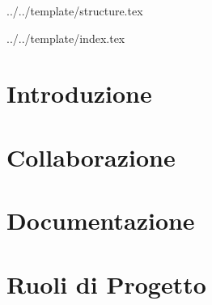 


\def\DOCUMENTO{Norme di Progetto}
\def\VERSIONE{1.0.0}

\def\DESCRIZIONE{Documento contenente l'insieme di norme stabilite dal gruppo \GRUPPO per la realizzazione del progetto didattico \PROGETTO.}

\def\REDATTORE {Suierica Bogdan \\ & Crespan Emanuele}
\def\VERIFICATORE {Agostinetto Matteo}
\def\RESPONSABILE {Burlin Valerio}

\def\USO {Interno}

\def\DISTRIBUZIONE {\GRUPPO{}\\ & \COMMITTENTE{}\\}

\def\DESCRIZIONE {Documento contenente l'insieme di norme stabilite dal gruppo \GRUPPO\ per la realizzazione di \PROGETTO.}


\def\INDICE	{true}
\def\TABELLE {false}
\def\FIGURE {true}


 {../../template/structure.tex}



 {../../template/index.tex}


\section{Introduzione}


\newpage
\section{Collaborazione}


\newpage
\section{Documentazione}


\newpage
\section{Ruoli di Progetto}



